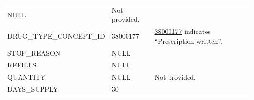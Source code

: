 \documentclass[11pt]{book}
\theoremstyle{definition}
\theoremstyle{definition}
\theoremstyle{definition}
\theoremstyle{remark}
\begin{document}
\begin{longtable}[]{@{}lll@{}}
\begin{minipage}[t]{0.15\columnwidth}
NULL\strut
\end{minipage} & \begin{minipage}[t]{0.49\columnwidth}\raggedright
Not provided.\strut
\end{minipage}\tabularnewline
\begin{minipage}[t]{0.28\columnwidth}\raggedright
DRUG\_TYPE\_CONCEPT\_ID\strut
\end{minipage} & \begin{minipage}[t]{0.15\columnwidth}\raggedright
38000177\strut
\end{minipage} & \begin{minipage}[t]{0.49\columnwidth}\raggedright
\href{http://athena.ohdsi.org/search-terms/terms/38000177}{38000177} indicates ``Prescription written''.\strut
\end{minipage}\tabularnewline
\begin{minipage}[t]{0.28\columnwidth}\raggedright
STOP\_REASON\strut
\end{minipage} & \begin{minipage}[t]{0.15\columnwidth}\raggedright
NULL\strut
\end{minipage} & \begin{minipage}[t]{0.49\columnwidth}\raggedright
\strut
\end{minipage}\tabularnewline
\begin{minipage}[t]{0.28\columnwidth}\raggedright
REFILLS\strut
\end{minipage} & \begin{minipage}[t]{0.15\columnwidth}\raggedright
NULL\strut
\end{minipage} & \begin{minipage}[t]{0.49\columnwidth}\raggedright
\strut
\end{minipage}\tabularnewline
\begin{minipage}[t]{0.28\columnwidth}\raggedright
QUANTITY\strut
\end{minipage} & \begin{minipage}[t]{0.15\columnwidth}\raggedright
NULL\strut
\end{minipage} & \begin{minipage}[t]{0.49\columnwidth}\raggedright
Not provided.\strut
\end{minipage}\tabularnewline
\begin{minipage}[t]{0.28\columnwidth}\raggedright
DAYS\_SUPPLY\strut
\end{minipage} & \begin{minipage}[t]{0.15\columnwidth}\raggedright
30\strut

\end{minipage}
\end{longtable}
\end{document}
